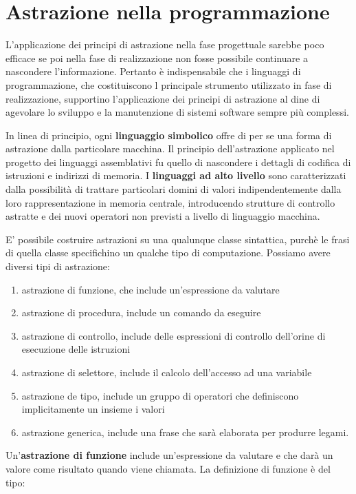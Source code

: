\documentclass[a4paper,18pt]{extarticle}
\begin{document}
\newpage

\section{ Astrazione nella programmazione}

L'applicazione dei principi di astrazione nella fase progettuale sarebbe poco efficace se poi nella fase di realizzazione non fosse possibile continuare a nascondere l'informazione. Pertanto è indispensabile che i linguaggi di programmazione, che costituiscono l principale strumento utilizzato in fase di realizzazione, supportino l'applicazione dei principi di astrazione al dine di agevolare lo sviluppo e la manutenzione di sistemi software sempre più complessi.

In linea di principio, ogni \textbf{linguaggio simbolico} offre di per se una forma di astrazione dalla particolare macchina. Il principio dell'astrazione applicato nel progetto dei linguaggi assemblativi fu quello di nascondere i dettagli di codifica di istruzioni e indirizzi di memoria. I \textbf{linguaggi ad alto livello} sono caratterizzati dalla possibilità di trattare particolari domini di valori indipendentemente dalla loro rappresentazione in memoria centrale, introducendo strutture di controllo astratte  e dei nuovi operatori non previsti a livello di linguaggio macchina.

E' possibile costruire astrazioni su una qualunque classe sintattica, purchè le frasi di quella classe specifichino un qualche tipo di computazione. Possiamo avere diversi tipi di astrazione:
\begin{enumerate}
    \item astrazione di funzione, che include un'espressione da valutare 
    \item astrazione di procedura, include un comando da eseguire
    \item astrazione di controllo, include delle espressioni di controllo dell'orine di esecuzione delle istruzioni
    \item astrazione di selettore, include il calcolo dell'accesso ad una variabile
    \item astrazione de tipo, include un gruppo di operatori che definiscono implicitamente un insieme i valori
    \item astrazione generica, include una frase che sarà elaborata per produrre legami.
\end{enumerate}

Un'\textbf{astrazione di funzione} include un'espressione da valutare e che darà un valore come risultato quando viene chiamata. La definizione di funzione è del tipo:
\end{document}
